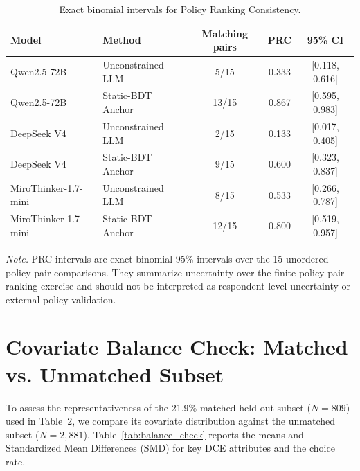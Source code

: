 \documentclass[11pt]{article}
\begin{document}
\begin{table}[t]
\centering
\caption{Exact binomial intervals for Policy Ranking Consistency.}
\label{tab:bootstrap_prc}
\small
\setlength{\tabcolsep}{6pt}
\begin{tabular}{l l c c c}
\toprule
Model & Method & Matching pairs & PRC & 95\% CI \\
\midrule
Qwen2.5-72B & Unconstrained LLM & 5/15 & 0.333 & [0.118, 0.616] \\
Qwen2.5-72B & Static-BDT Anchor & 13/15 & 0.867 & [0.595, 0.983] \\
\midrule
DeepSeek V4 & Unconstrained LLM & 2/15 & 0.133 & [0.017, 0.405] \\
DeepSeek V4 & Static-BDT Anchor & 9/15 & 0.600 & [0.323, 0.837] \\
\midrule
MiroThinker-1.7-mini & Unconstrained LLM & 8/15 & 0.533 & [0.266, 0.787] \\
MiroThinker-1.7-mini & Static-BDT Anchor & 12/15 & 0.800 & [0.519, 0.957] \\
\bottomrule
\end{tabular}

\vspace{0.4em}
\begin{minipage}{0.95\textwidth}
\small
\textit{Note.} PRC intervals are exact binomial 95\% intervals over the 15 unordered policy-pair comparisons. They summarize uncertainty over the finite policy-pair ranking exercise and should not be interpreted as respondent-level uncertainty or external policy validation.
\end{minipage}
\end{table}

\section{Covariate Balance Check: Matched vs. Unmatched Subset}
\label{app:balance_check}

To assess the representativeness of the 21.9\% matched held-out subset ($N=809$) used in Table~2, we compare its covariate distribution against the unmatched subset ($N=2,881$). Table~\ref{tab:balance_check} reports the means and Standardized Mean Differences (SMD) for key DCE attributes and the choice rate. 
\end{document}
